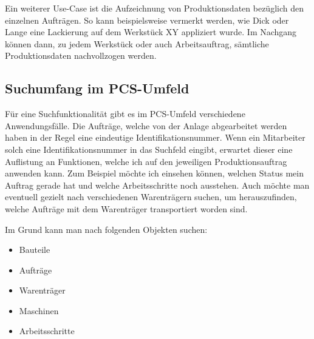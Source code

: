Ein weiterer Use-Case ist die Aufzeichnung von Produktionsdaten bezüglich den einzelnen Aufträgen. So kann beispielsweise vermerkt werden, wie Dick oder Lange eine Lackierung auf dem Werkstück XY appliziert wurde. Im Nachgang können dann, zu jedem Werkstück oder auch Arbeitsauftrag, sämtliche Produktionsdaten nachvollzogen werden.

\subsection{Suchumfang im PCS-Umfeld\label{subsec3.3.1:Unterunterpunkt-1}}
Für eine Suchfunktionalität gibt es im PCS-Umfeld verschiedene Anwendungsfälle. Die Aufträge, welche von der Anlage abgearbeitet werden haben in der Regel eine eindeutige Identifikationsnummer. Wenn ein Mitarbeiter solch eine Identifikationsnummer in das Suchfeld eingibt, erwartet dieser eine Auflistung an Funktionen, welche ich auf den jeweiligen Produktionsauftrag anwenden kann. Zum Beispiel möchte ich einsehen können, welchen Status mein Auftrag gerade hat und welche Arbeitsschritte noch ausstehen. Auch möchte man eventuell gezielt nach verschiedenen Warenträgern suchen, um herauszufinden, welche Aufträge mit dem Warenträger transportiert worden sind.

Im Grund kann man nach folgenden Objekten suchen:

\begin{itemize}
    \item Bauteile
    \item Aufträge
    \item Warenträger
    \item Maschinen
    \item Arbeitsschritte
\end{itemize}